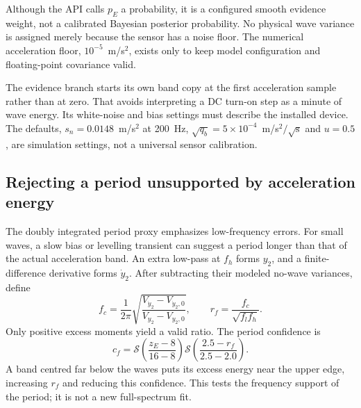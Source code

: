 \documentclass[conference]{IEEEtran}
\begin{document}
Although the API calls $p_E$ a probability, it is a configured smooth
evidence weight, not a calibrated Bayesian posterior probability.
No physical wave variance is assigned merely because the sensor has a
noise floor. The numerical acceleration floor, $10^{-5}$~m/s$^2$, exists
only to keep model configuration and floating-point covariance valid.

The evidence branch starts its own band copy at the first acceleration
sample rather than at zero. That avoids interpreting a DC turn-on step as
a minute of wave energy. Its white-noise and bias settings must describe
the installed device. The defaults, $s_n=0.0148$~m/s$^2$ at 200~Hz,
$\sqrt{q_b}=5\times10^{-4}$~m/s$^2/\sqrt{\mathrm s}$ and $u=0.5$, are
simulation settings, not a universal sensor calibration.

\subsection{Rejecting a period unsupported by acceleration energy}
The doubly integrated period proxy emphasizes low-frequency errors.
For small waves, a slow bias or levelling transient can suggest a period
longer than that of the actual acceleration band. An extra low-pass at
$f_h$ forms $y_2$, and a finite-difference derivative forms $\dot y_2$.
After subtracting their modeled no-wave variances, define
\begin{equation}
 f_c=\frac1{2\pi}\sqrt{\frac{V_{\dot y_2}-V_{\dot y_2,0}}
                                  {V_{y_2}-V_{y_2,0}}},\qquad
 r_f=\frac{f_c}{\sqrt{f_lf_h}}.
 \label{eq:fc}
\end{equation}
Only positive excess moments yield a valid ratio. The period confidence is
\begin{equation}
 c_f=\mathcal S\!\left(\frac{z_E-8}{16-8}\right)
         \mathcal S\!\left(\frac{2.5-r_f}{2.5-2.0}\right).
 \label{eq:cf}
\end{equation}
A band centred far below the waves puts its excess energy near the upper
edge, increasing $r_f$ and reducing this confidence. This tests the
frequency support of the period; it is not a new full-spectrum fit.
\end{document}
